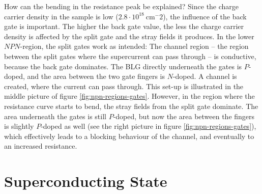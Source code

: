 How can the bending in the resistance peak be explained?  Since the charge carrier density in the sample is low ($2.8\cdot 10^{18}\ \text{cm}^-2$), the influence of the back gate is important. The higher the back gate value, the less the charge carrier density is affected by the split gate and the stray fields it produces. In the lower $NPN$-region, the split gates work as intended: The channel region -- the region between the split gates where the supercurrent can pass through -- is conductive, because the back gate dominates. The BLG directly underneath the gates is $P$-doped, and the area between the two gate fingers is $N$-doped. A channel is created, where the current can pass through. This set-up is illustrated in the middle picture of figure \ref{fig:npn-regions-gates}. However, in the region where the resistance curve starts to bend, the stray fields from the split gate dominate. The area underneath the gates is still $P$-doped, but now the area between the fingers is slightly $P$-doped as well (see the right picture in figure \ref{fig:npn-regions-gates}), which effectively leads to a blocking behaviour of the channel, and eventually to an increased resistance.

\section{Superconducting State}\label{sec:experiment-superconducting}

